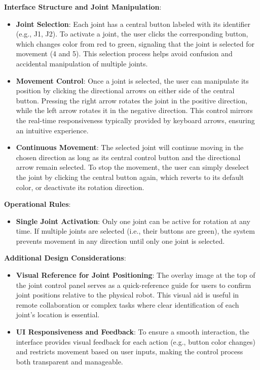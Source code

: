 \textbf{Interface Structure and Joint Manipulation}:
\begin{itemize}
    \item \textbf{Joint Selection}: Each joint has a central button labeled with its identifier (e.g., J1, J2). To activate a joint, the user clicks the corresponding button, which changes color from red to green, signaling that the joint is selected for movement (4 and 5). This selection process helps avoid confusion and accidental manipulation of multiple joints.

    \item \textbf{Movement Control}: Once a joint is selected, the user can manipulate its position by clicking the directional arrows on either side of the central button. Pressing the right arrow rotates the joint in the positive direction, while the left arrow rotates it in the negative direction. This control mirrors the real-time responsiveness typically provided by keyboard arrows, ensuring an intuitive experience.

    \item \textbf{Continuous Movement}: The selected joint will continue moving in the chosen direction as long as its central control button and the directional arrow remain selected. To stop the movement, the user can simply deselect the joint by clicking the central button again, which reverts to its default color, or deactivate its rotation direction.
\end{itemize}

\textbf{Operational Rules}:
\begin{itemize}
    \item \textbf{Single Joint Activation}: Only one joint can be active for rotation at any time. If multiple joints are selected (i.e., their buttons are green), the system prevents movement in any direction until only one joint is selected.

\end{itemize}

\textbf{Additional Design Considerations}:
\begin{itemize}
    \item \textbf{Visual Reference for Joint Positioning}: The overlay image at the top of the joint control panel serves as a quick-reference guide for users to confirm joint positions relative to the physical robot. This visual aid is useful in remote collaboration or complex tasks where clear identification of each joint’s location is essential.

    \item \textbf{UI Responsiveness and Feedback}: To ensure a smooth interaction, the interface provides visual feedback for each action (e.g., button color changes) and restricts movement based on user inputs, making the control process both transparent and manageable.
\end{itemize}

